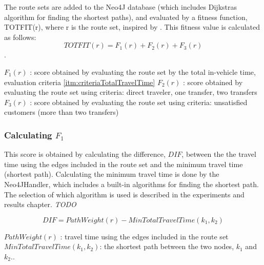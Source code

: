 The route sets are added to the Neo4J database (which includes Dijkstras algorithm for finding the shortest paths), and evaluated by a fitness function, TOTFIT(r), where r is the route set, inspired by \citep{kechagiopoulos14}.
This fitness value is calculated as follows:
$$ TOTFIT(r) = F_{1}(r) + F_{2}(r) + F_{3}(r)$$. 

$ F_{1}(r)$ : score obtained by evaluating the route set by the total in-vehicle time, evaluation criteria \ref{itm:criteriaTotalTravelTime}
\newline
$ F_{2}(r)$ : score obtained by evaluating the route set using criteria: direct traveler, one transfer, two transfers
\newline
$ F_{3}(r)$ : score obtained by evaluating the route set using criteria: unsatisfied customers (more than two transfers)
\newline

\subsubsection{Calculating $F_{1}$}

This score is obtained by calculating the difference, $DIF$, between the the travel time using the edges included in the route set and the minimum travel time (shortest path). Calculating the minimum travel time is done by the Neo4JHandler, which includes a built-in algorithms for finding the shortest path. The selection of which algorithm is used is described in the experiments and results chapter. 
\emph{\color{red} TODO}

$$ DIF = PathWeight(r) - MinTotalTravelTime(k_{1},k_{2})$$

$ PathWeight(r)$ : travel time using the edges included in the route set
\newline
$ MinTotalTravelTime(k_{1},k_{2})$: the shortest path between the two nodes, $k_{1}$ and $k_{2}$..
 

